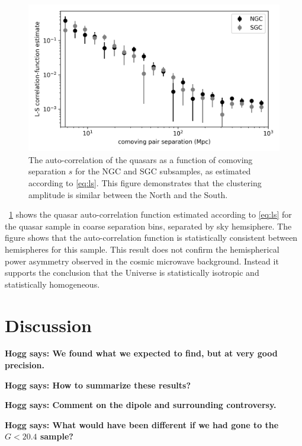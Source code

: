 \documentclass[modern]{aastex631}
\newlength{\figurewidth}
\newcommand{\figref}[1]{\figurename~\ref{#1}}
\newcommand{\hogg}[1]{\textbf{Hogg says: #1}}
\begin{document}
\begin{figure}[t!]
  \begin{mdframed}
  \color{captiongray}
  \begin{center}
    \includegraphics[width=\figurewidth]{notebooks/corrfunc.png}
  \end{center}
    \caption{The auto-correlation of the quasars as a function of comoving separation $s$ for the NGC and SGC subsamples, as estimated according to \eqref{eq:ls}.
    This figure demonstrates that the clustering amplitude is similar between the North and the South.\label{fig:corrfunc}}
  \end{mdframed}
\end{figure}
\figref{fig:corrfunc} shows the quasar auto-correlation function estimated according to \eqref{eq:ls} for the quasar sample in coarse separation bins, separated by sky hemsiphere.
The figure shows that the auto-correlation function is statistically consistent between hemispheres for this sample.
This result does not confirm the hemispherical power asymmetry observed in the cosmic microwave background.
Instead it supports the conclusion that the Universe is statistically isotropic and statistically homogeneous.

\section{Discussion}\label{sec:discuss}\noindent
\hogg{We found what we expected to find, but at very good precision.}

\hogg{How to summarize these results?}

\hogg{Comment on the dipole and surrounding controversy.}

\hogg{What would have been different if we had gone to the $G<20.4$ sample?}
\end{document}
